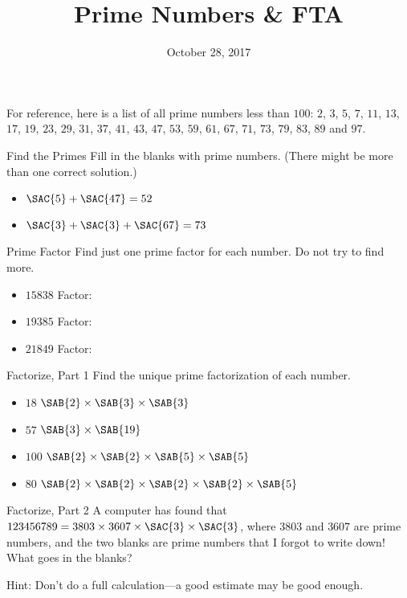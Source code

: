 \documentclass[12pt,letterpaper]{article}
\title{Prime Numbers \& FTA}
\date{October 28, 2017}
\begin{document}
\maketitle

\thispagestyle{empty}

For reference, here is a list of all prime numbers less than $100$: $2$, $3$,
$5$, $7$, $11$, $13$, $17$, $19$, $23$, $29$, $31$, $37$, $41$, $43$, $47$,
$53$, $59$, $61$, $67$, $71$, $73$, $79$, $83$, $89$ and $97$.

\begin{problem}{Find the Primes}
 Fill in the blanks with prime numbers. (There might be more than one correct
 solution.)

 \begin{itemize}
  \item \(\SAC{5} + \SAC{47} = 52\)
  \item \(\SAC{3} + \SAC{3} + \SAC{67} = 73\)
 \end{itemize}
\end{problem}

\begin{problem}{Prime Factor}
 Find just one prime factor for each number. Do not try to find more.

 \begin{itemize}
  \item $15838$ \hfill Factor: 
  \item $19385$ \hfill Factor: 
  \item $21849$ \hfill Factor: 
 \end{itemize}
\end{problem}

\begin{problem}{Factorize, Part 1}
 Find the unique prime factorization of each number.

 \begin{itemize}
  \item $18$ \hfill $\SAB{2} \times \SAB{3} \times \SAB{3}$
  \item $57$ \hfill $\SAB{3} \times \SAB{19}$
  \item $100$ \hfill $\SAB{2} \times \SAB{2} \times \SAB{5} \times \SAB{5}$
  \item $80$ \hfill $\SAB{2} \times \SAB{2} \times \SAB{2} \times \SAB{2}
  \times \SAB{5}$
 \end{itemize}
\end{problem}

\begin{problem}{Factorize, Part 2}
  A computer has found that \(123456789 = 3803 \times 3607 \times \SAC{3}
  \times \SAC{3}\), where \(3803\) and \(3607\) are prime numbers, and the two
  blanks are prime numbers that I forgot to write down! What goes in the
  blanks?

  Hint: Don't do a full calculation---a good estimate may be good enough.
\end{problem}
\end{document}
